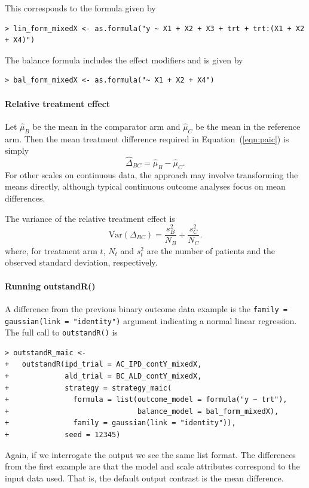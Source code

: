 \documentclass[article]{jss}
\begin{document}
This corresponds to the  formula given by
\begin{verbatim}
> lin_form_mixedX <- as.formula("y ~ X1 + X2 + X3 + trt + trt:(X1 + X2 + X4)")
\end{verbatim}

The balance formula includes the effect modifiers and is given by
\begin{verbatim}
> bal_form_mixedX <- as.formula("~ X1 + X2 + X4")
\end{verbatim}

\paragraph{Relative treatment effect}
Let $\hat{\mu}_B$ be the mean in the comparator arm and $\hat{\mu}_C$ be the mean in the reference arm. Then the mean treatment difference required in Equation~(\ref{eqn:paic}) is simply
$$
\hat{\Delta}_{BC} = \hat{\mu}_B - \hat{\mu}_C.
$$
For other scales on continuous data, the approach may involve transforming the means directly, although typical continuous outcome analyses focus on mean differences.

The variance of the relative treatment effect is
$$
\text{Var}(\Delta_{BC}) = \frac{s_B^2}{N_B} + \frac{s_C^2}{N_C}.
$$
where, for treatment arm $t$, $N_t$ and $s_t^2$ are the number of patients and the observed standard deviation, respectively.

\paragraph{Running outstandR()}
A difference from the previous binary outcome data example is the \texttt{family = gaussian(link = "identity")} argument indicating a normal linear regression. The full call to \texttt{outstandR()} is

\begin{verbatim}
> outstandR_maic <-
+   outstandR(ipd_trial = AC_IPD_contY_mixedX, 
+             ald_trial = BC_ALD_contY_mixedX,
+             strategy = strategy_maic(
+               formula = list(outcome_model = formula("y ~ trt"),
+                              balance_model = bal_form_mixedX),
+               family = gaussian(link = "identity")),
+             seed = 12345)
\end{verbatim}

Again, if we interrogate the output we see the same list format. The differences from the first example are that the model and scale attributes correspond to the input data used. That is, the default output contrast is the mean difference.
\end{document}
